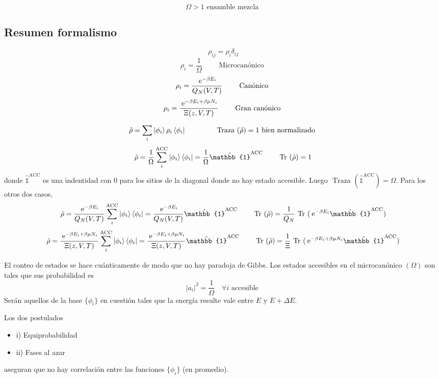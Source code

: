 \documentclass[10pt,oneside]{CBFT_book}
\begin{document}
\[
	\Omega > 1 \text{ ensamble mezcla }
\]

\subsection{Resumen formalismo}

\[
	\rho_{ij} = \rho_i \delta_{ij}
\]
\[
	\rho_i = \frac{1}{\Omega} \qquad \text{ Microcanónico }
\]
\[
	\rho_i = \frac{\:\mathrm{e}^{-\beta E_i}}{Q_N(V,T)}  \qquad  \text{ Canónico }
\]
\[
	\rho_i = \frac{\:\mathrm{e}^{-\beta E_i + \beta \mu N_i }}{\Xi(z,V,T)}  \qquad  \text{ Gran canónico }
\]

\[
	\hat{\rho} = \sum_i \Ket{ \phi_i } \rho_i \Bra{ \phi_i } \qquad \qquad \text{ Traza }(\hat{\rho} ) =
	1 \text{ bien normalizado }
\]
\[
	\hat{\rho} = \frac{1}{\Omega} \sum_i^{\text{ACC}} \Ket{ \phi_i } \Bra{ \phi_i } = 
	\frac{1}{\Omega} \hat{\mathbb{1}}^{\text{ACC}}  \qquad \text{ Tr }(\hat{\rho} ) = 1 
\]
donde $ \hat{\mathbb{1}}^{\text{ACC}}  $ es una indentidad con 0 para los sitios de la diagonal donde no hay
estado accesible. Luego $ \text{ Traza }(\hat{\mathbb{1}}^{\text{ACC}})  = \Omega $. Para los otros dos casos,
\[
	\hat{\rho} = \frac{\euler^{-\beta E_i}}{Q_N(V,T)}  \sum_i^{\text{ACC}} \Ket{ \phi_i } \Bra{ \phi_i } = 
	\frac{\euler^{-\beta E_i}}{Q_N(V,T)} \hat{\mathbb{1}}^{\text{ACC}} 
	\qquad \text{ Tr }(\hat{\rho} ) = \frac{1}{Q_N} \text{ Tr }( \euler^{-\beta E_i} \hat{\mathbb{1}}^{\text{ACC}} )
\]
\[
	\hat{\rho} = \frac{\euler^{-\beta E_i + \beta \mu N_i }}{\Xi(z,V,T)} 
	\sum_i^{\text{ACC}} \Ket{ \phi_i } \Bra{ \phi_i } = 
	\frac{\euler^{-\beta E_i + \beta \mu N_i }}{\Xi(z,V,T)} \hat{\mathbb{1}}^{\text{ACC}} 
	\qquad \text{ Tr }(\hat{\rho} ) = 
	\frac{1}{\Xi} \text{ Tr }( \euler^{-\beta E_i + \beta \mu N_i } \hat{\mathbb{1}}^{\text{ACC}} ) 
\]

El conteo de estados se hace cuánticamente de modo que no hay paradoja de Gibbs. Los estados accesibles en el
microcanónico $ (\Omega) $ son tales que sus probabilidad es 
\[
	| a_i |^2 = \frac{1}{\Omega} \quad \forall i \text{ accesible }
\]
Serán aquellos de la base $ \{ \phi_i \} $ en cuestión tales que la energía resulte vale entre $E$ y $E+\Delta E$.

Los dos postulados
\begin{itemize}
 \item i) Equiprobabilidad
 \item ii) Fases al azar
\end{itemize}
aseguran que no hay correlación entre las funciones $ \{ \phi_i \} $ (en promedio).




\end{document}

